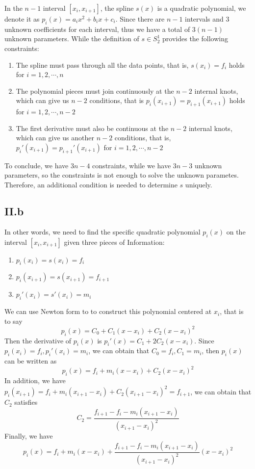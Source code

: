 \documentclass[a4paper]{article}
\begin{document}
In the $n-1$ interval $[x_i,x_{i+1}]$, the spline $s(x)$ is a quadratic polynomial, we denote it as $p_i(x)=a_ix^2+b_ix+c_i$.
Since there are $n-1$ intervals and 3 unknown coefficients for each interval, thus we have a total of $3(n-1)$ unknown parameters.
While the definition of $s\in S_2^1$ provides the following constraints:

\begin{enumerate}
  \item The spline must pass through all the data points, that is, $s(x_i)=f_i$ holds for $i=1,2,\cdots,n$
  \item The polynomial pieces must join continuously at the $n-2$ internal knots, which can give us $n-2$ conditions, that is $p_i(x_{i+1})=p_{i+1}(x_{i+1})$ holds for $i=1,2,\cdots,n-2$
  \item The first derivative must also be continuous at the $n-2$ internal knots, which can give us another $n-2$ conditions, that is, $p_i'(x_{i+1})=p_{i+1}'(x_{i+1})$ for $i=1,2,\cdots,n-2$ 
\end{enumerate}

To conclude, we have $3n-4$ constraints, while we have $3n-3$ unknown parameters, so the constraints is not enough to solve the unknown parametes. Therefore, an additional condition is needed to determine $s$ uniquely.

\subsection*{II.b}
In other words, we need to find the specific quadratic polynomial $p_i(x)$ on the interval $[x_i,x_{i+1}]$ given three pieces of Information:
\begin{enumerate}
  \item $p_i(x_i) = s(x_i)=f_i$
  \item $p_i(x_{i+1}) = s(x_{i+1})=f_{i+1}$
  \item $p_i'(x_i)=s'(x_i)=m_i$
\end{enumerate}
We can use Newton form to to construct this polynomial centered at $x_i$, that is to say
\begin{equation}
  p_i(x)=C_0+C_1(x-x_i)+C_2(x-x_i)^2
\end{equation}
Then the derivative of $p_i(x)$ is $p_i'(x)=C_1+2C_2(x-x_i)$. Since $p_i(x_i)=f_i,p_i'(x_i)=m_i$, we can obtain that $C_0=f_i,C_1=m_i$, then $p_i(x)$ can be written as
\begin{equation}
  p_i(x)=f_i+m_i(x-x_i)+C_2(x-x_i)^2
\end{equation}
In addition, we have $p_{i}(x_{i+1})=f_i+m_i(x_{i+1}-x_i)+C_2(x_{i+1}-x_i)^2=f_{i+1}$, we can obtain that $C_2$ satisfies
\begin{equation}
  C_2=\frac{f_{i+1}-f_i-m_i(x_{i+1}-x_i)}{(x_{i+1}-x_i)^2}
\end{equation}
Finally, we have
\begin{equation}
  p_i(x)=f_i+m_i(x-x_i)+\frac{f_{i+1}-f_i-m_i(x_{i+1}-x_i)}{(x_{i+1}-x_i)^2}(x-x_i)^2 \label{eq:conclusion}  
\end{equation}
\end{document}
